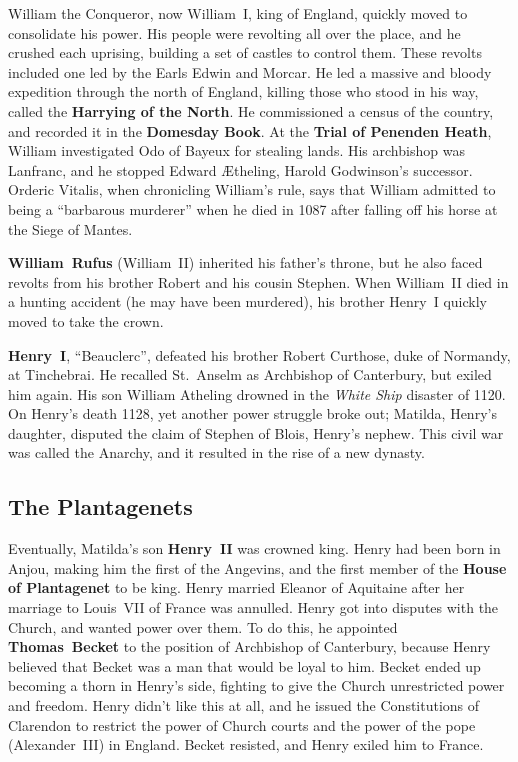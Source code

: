 William the Conqueror, now William~I, king of England, quickly moved to consolidate his power.
His people were revolting all over the place, and he crushed each uprising,
building a set of castles to control them.
These revolts included one led by the Earls Edwin and Morcar.
He led a massive and bloody expedition through the north of England,
killing those who stood in his way, called the \textbf{Harrying of the North}.
He commissioned a census of the country, and recorded it in the \textbf{Domesday Book}.
At the \textbf{Trial of Penenden Heath}, William investigated Odo of Bayeux for stealing lands.
His archbishop was Lanfranc, and he stopped Edward \AE{}theling, Harold Godwinson's successor.
Orderic Vitalis, when chronicling William's rule, says that William admitted to being a ``barbarous murderer''
when he died in 1087 after falling off his horse at the Siege of Mantes.

\textbf{William~Rufus} (William~II) inherited his father's throne,
but he also faced revolts from his brother Robert and his cousin Stephen.
When William~II died in a hunting accident (he may have been murdered),
his brother Henry~I quickly moved to take the crown.

\textbf{Henry~I}, ``Beauclerc'', defeated his brother Robert Curthose, duke of Normandy, at Tinchebrai.
He recalled St.\ Anselm as Archbishop of Canterbury, but exiled him again.
His son William Atheling drowned in the \textit{White Ship} disaster of 1120.
On Henry's death 1128, yet another power struggle broke out;
Matilda, Henry's daughter, disputed the claim of Stephen of Blois, Henry's nephew.
This civil war was called the Anarchy, and it resulted in the rise of a new dynasty.

\subsection*{The Plantagenets}

Eventually, Matilda's son \textbf{Henry~II} was crowned king.
Henry had been born in Anjou, making him the first of the Angevins,
and the first member of the \textbf{House of Plantagenet} to be king.
Henry married Eleanor of Aquitaine after her marriage to Louis~VII of France was annulled.
Henry got into disputes with the Church, and wanted power over them.
To do this, he appointed \textbf{Thomas~Becket} to the position of Archbishop of Canterbury,
because Henry believed that Becket was a man that would be loyal to him.
Becket ended up becoming a thorn in Henry's side, fighting to give the Church unrestricted power and freedom.
Henry didn't like this at all,
and he issued the Constitutions of Clarendon to restrict the power of Church courts
and the power of the pope (Alexander~III) in England.
Becket resisted, and Henry exiled him to France.

